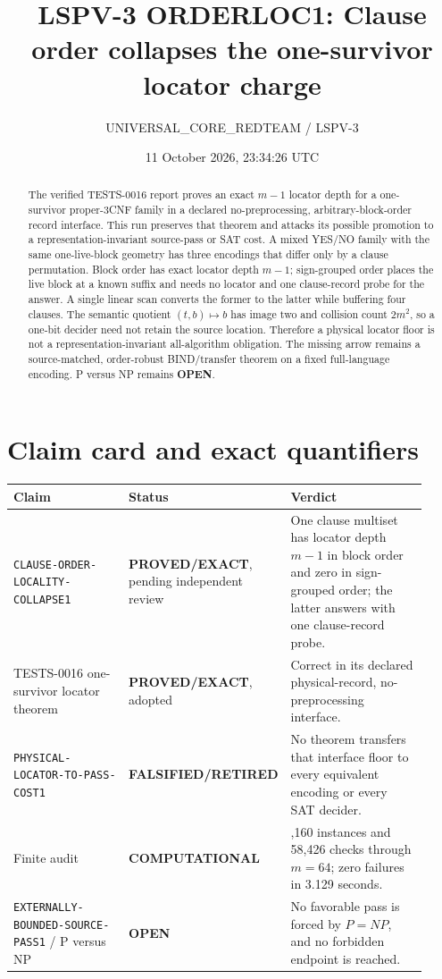 \documentclass[11pt]{article}
\title{LSPV-3 ORDERLOC1: Clause order collapses the one-survivor locator charge}
\author{UNIVERSAL\_CORE\_REDTEAM / LSPV-3}
\date{11 October 2026, 23:34:26 UTC}
\newcommand{\EXACT}{\textbf{PROVED/EXACT}}
\newcommand{\COMP}{\textbf{COMPUTATIONAL}}
\newcommand{\OPEN}{\textbf{OPEN}}
\newcommand{\RETIRED}{\textbf{FALSIFIED/RETIRED}}
\begin{document}
\maketitle

\begin{abstract}
The verified TESTS-0016 report proves an exact $m-1$ locator depth for a
one-survivor proper-$3$CNF family in a declared no-preprocessing,
arbitrary-block-order record interface.  This run preserves that theorem and
attacks its possible promotion to a representation-invariant source-pass or
SAT cost.  A mixed YES/NO family with the same one-live-block geometry has
three encodings that differ only by a clause permutation.  Block order has
exact locator depth $m-1$; sign-grouped order places the live block at a known
suffix and needs no locator and one clause-record probe for the answer.  A
single linear scan converts the former to the latter while buffering four
clauses.  The semantic quotient $(t,b)\mapsto b$ has image two and collision
count $2m^2$, so a one-bit decider need not retain the source location.
Therefore a physical locator floor is not a representation-invariant
all-algorithm obligation.  The missing arrow remains a source-matched,
order-robust BIND/transfer theorem on a fixed full-language encoding.
P versus NP remains \OPEN.
\end{abstract}

\section{Claim card and exact quantifiers}

\begin{center}\scriptsize
\begin{tabular}{>{\raggedright\arraybackslash}p{0.31\linewidth}>{\raggedright\arraybackslash}p{0.23\linewidth}>{\raggedright\arraybackslash}p{0.38\linewidth}}
\toprule
Claim & Status & Verdict\\
\midrule
\texttt{CLAUSE-ORDER-LOCALITY-COLLAPSE1} & \EXACT, pending independent review &
One clause multiset has locator depth $m-1$ in block order and zero in
sign-grouped order; the latter answers with one clause-record probe.\\
TESTS-0016 one-survivor locator theorem & \EXACT, adopted & Correct in its
declared physical-record, no-preprocessing interface.\\
\texttt{PHYSICAL-LOCATOR-TO-PASS-COST1} & \RETIRED & No theorem transfers
that interface floor to every equivalent encoding or every SAT decider.\\
Finite audit & \COMP & 4,160 instances and 58,426 checks through $m=64$;
zero failures in 3.129 seconds.\\
\texttt{EXTERNALLY-BOUNDED-SOURCE-PASS1} / P versus NP & \OPEN & No
favorable pass is forced by $P=NP$, and no forbidden endpoint is reached.\\
\bottomrule
\end{tabular}
\end{center}
\end{document}
